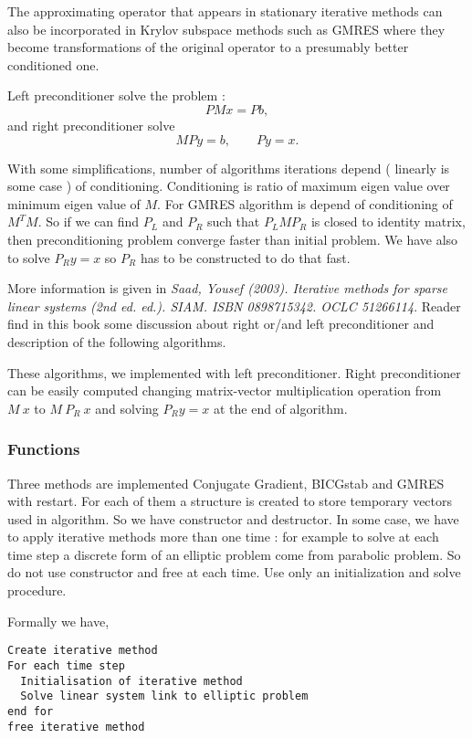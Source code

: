 The approximating operator that appears in stationary iterative methods can
also be incorporated in Krylov subspace methods such as GMRES where they
become transformations of the original operator
to a presumably better conditioned one.

Left preconditioner solve the problem :
$$ P M x = P b, $$
and right preconditioner solve
$$ M P y  = b, \quad \quad P y = x.$$

With some simplifications, number of algorithms iterations depend ( linearly is
some case ) of conditioning. Conditioning is ratio of maximum eigen value over minimum
eigen value of $M$. For GMRES algorithm is depend of conditioning of $M^{T}
M$. So if we can find $P_L$ and $P_R$ such that $P_L M P_R$ is closed to
identity matrix, then preconditioning problem converge faster than initial
problem. We have also to solve $P_R y = x$ so $P_R$ has to be constructed to
do that fast.

More information is given in {\em Saad, Yousef (2003). Iterative methods for
  sparse linear systems (2nd ed. ed.). SIAM. ISBN 0898715342. OCLC 51266114}.
Reader find in this book some discussion about right or/and left
preconditioner and description of the following algorithms. 

These algorithms, we implemented with left preconditioner. Right
preconditioner can be easily computed changing matrix-vector multiplication
operation from $M \ x $ to $ M \ P_R \ x$ and solving $P_R y = x$ at the end
of algorithm.


\subsubsection{Functions}
Three methods are implemented Conjugate Gradient, BICGstab and GMRES with restart. For each
of them a structure is created to store temporary vectors used in algorithm. So
we have constructor and destructor. In some case, we have to apply iterative
methods more than one time : for example to solve at each time step a discrete form of an elliptic
problem come from parabolic problem. So do not use constructor and free at
each time. Use only an initialization and solve procedure.  

Formally we have, 
\begin{verbatim}
Create iterative method
For each time step
  Initialisation of iterative method
  Solve linear system link to elliptic problem
end for
free iterative method
\end{verbatim}

